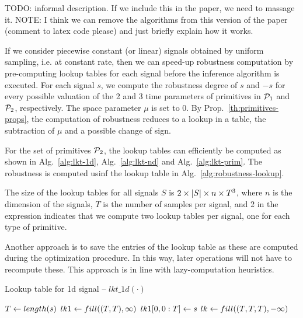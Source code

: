 {\color{orange}
TODO: informal description. If we include this
in the paper, we need to massage it.
NOTE: I think we can remove the algorithms
from this version of the paper
(comment to latex code please) and just
briefly explain how it works.

If we consider piecewise constant (or linear)
signals obtained by uniform sampling, i.e.
at constant rate, then we can speed-up
robustness computation by pre-computing
lookup tables for each signal before the
inference algorithm is executed.
For each signal $s$, we compute the robustness
degree of $s$ and $-s$ for every possible
valuation of the 2 and 3 time parameters
of primitives in $\mathcal{P}_1$ and $\mathcal{P}_2$,
respectively. The space parameter $\mu$ is set
to 0.
By Prop.~\ref{th:primitives-props}, the computation
of robustness reduces to a lookup in a table,
the subtraction of $\mu$ and a possible change of sign.

For the set of primitives $\mathcal{P}_2$, the lookup
tables can efficiently be computed as
shown in Alg.~\ref{alg:lkt-1d}, Alg.~\ref{alg:lkt-nd}
and Alg.~\ref{alg:lkt-prim}. The robustness is
computed usinf the lookup table in
Alg.~\ref{alg:robustness-lookup}.

The size of the lookup tables for all signals $S$ is
$2\times \left| {S} \right| \times n \times T^3$, where $n$ is the
dimension of the signals, $T$ is the number
of samples per signal, and 2 in the expression
indicates that we compute two lookup tables per
signal, one for each type of primitive.

Another approach is to save the entries of the
lookup table as these are computed during the
optimization procedure. In this way, later
operations will not have to recompute these.
This approach is in line with lazy-computation
heuristics.
}

\begin{algorithm}
\caption{Lookup table for 1d signal -- $lkt\_1d(\cdot)$}
\label{alg:lkt-1d}
\DontPrintSemicolon
{}
\BlankLine

$T \leftarrow length(s)$ \;
$lk1 \leftarrow fill((T, T), \infty)$\;
$lk1[0, 0:T] \leftarrow s$\;
$lk \leftarrow fill((T, T, T), -\infty)$\;
\end{algorithm}


